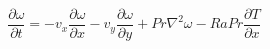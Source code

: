 \documentclass[preview]{standalone}
\begin{document}
\setcounter{equation}{8}
\begin{equation}
    \frac{\partial \omega}{\partial t} = -v_x \frac{\partial \omega}{\partial x} -v_y \frac{\partial \omega}{\partial y} + Pr \nabla^2 \omega - Ra Pr \frac{\partial T}{\partial x}
\end{equation}
\end{document}
